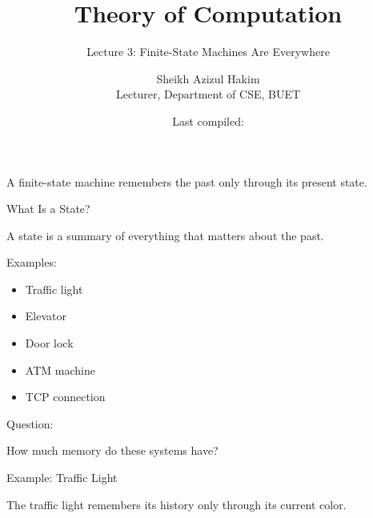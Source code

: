 \documentclass[10pt,aspectratio=169]{beamer}
\title{Theory of Computation}
\subtitle{Lecture 3: Finite-State Machines Are Everywhere}
\author{Sheikh Azizul Hakim\\Lecturer, Department of CSE, BUET}
\date{Last compiled: \LastCompiled}
\begin{document}
\maketitle

\begin{frame}[standout]
A finite-state machine remembers the past only through its present state.
\end{frame}

\begin{frame}{What Is a State?}

A state is a summary of everything that matters about the past.

\vspace{1em}

Examples:

\begin{itemize}
\item Traffic light
\item Elevator
\item Door lock
\item ATM machine
\item TCP connection
\end{itemize}

\vspace{1em}

Question:

\begin{center}
How much memory do these systems have?
\end{center}

\end{frame}

\begin{frame}{Example: Traffic Light}

\begin{center}


\end{center}

\vspace{1em}

The traffic light remembers its history only through its current color.

\end{frame}
\end{document}
